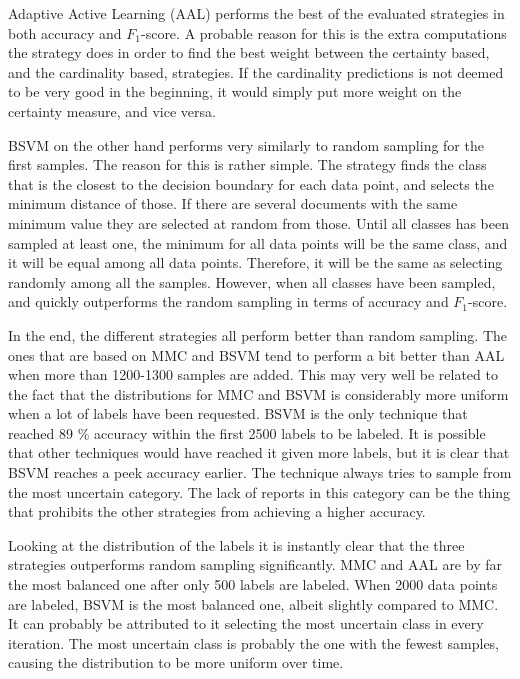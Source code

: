 Adaptive Active Learning (AAL) performs the best of the evaluated strategies in both accuracy and $F_1$-score. 
A probable reason for this is the extra computations the strategy does in order to find the best weight between the certainty based, and the cardinality based, strategies.
If the cardinality predictions is not deemed to be very good in the beginning, it would simply put more weight on the certainty measure, and vice versa.

BSVM on the other hand performs very similarly to random sampling for the first samples.
The reason for this is rather simple.
The strategy finds the class that is the closest to the decision boundary for each data point, and selects the minimum distance of those.
If there are several documents with the same minimum value they are selected at random from those.
Until all classes has been sampled at least one, the minimum for all data points will be the same class, and it will be equal among all data points.
Therefore, it will be the same as selecting randomly among all the samples.
However, when all classes have been sampled, and quickly outperforms the random sampling in terms of accuracy and $F_1$-score.

In the end, the different strategies all perform better than random sampling.
The ones that are based on MMC and BSVM tend to perform a bit better than AAL when more than 1200-1300 samples are added.
This may very well be related to the fact that the distributions for MMC and BSVM is considerably more uniform when a lot of labels have been requested.
BSVM is the only technique that reached 89 \% accuracy within the first 2500 labels to be labeled.
It is possible that other techniques would have reached it given more labels, but it is clear that BSVM reaches a peek accuracy earlier.
The technique always tries to sample from the most uncertain category.
The lack of reports in this category can be the thing that prohibits the other strategies from achieving a higher accuracy.

Looking at the distribution of the labels it is instantly clear that the three strategies outperforms random sampling significantly.
MMC and AAL are by far the most balanced one after only 500 labels are labeled.
When 2000 data points are labeled, BSVM is the most balanced one, albeit slightly compared to MMC.
It can probably be attributed to it selecting the most uncertain class in every iteration.
The most uncertain class is probably the one with the fewest samples, causing the distribution to be more uniform over time.

